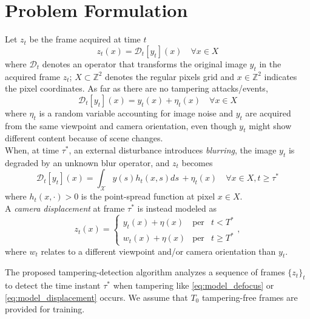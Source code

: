 \documentclass{llncs}
\begin{document}
\section{Problem Formulation}\label{sec:probForm}
%
Let $z_t$ be the frame acquired at time $t$
\begin{equation}
\label{eq:observationModel}
z_t(x)=\mathcal{D}_t[y_t](x) \quad \forall x \in X
\end{equation}
where $\mathcal{D}_t$ denotes an operator that transforms the original image $y_t$ in the acquired frame $z_t$; $X \subset \mathbb{Z}^2$ denotes the regular pixels grid and $x\in \mathbb{Z}^2$ indicates the pixel coordinates. As far as there are no tampering attacks/events,
\begin{equation}
\label{eq:no_tampering}
\mathcal{D}_t[y_t](x) = y_t(x) + \eta_t(x) \quad \forall x \in X
\end{equation}
where $\eta_t$ is a random variable accounting for image noise and $y_t$ are acquired from the same viewpoint and camera orientation, even though $y_t$ might show different content because of scene changes.\\
When, at time $\tau^*$, an external disturbance introduces \emph{blurring}, the image $y_t$ is degraded by an unknown blur operator, and $z_t$ becomes
\begin{equation}
\label{eq:model_defocus}
\mathcal{D}_t[y_t](x) = \int_{\mathcal{X}}y(s)h_t(x,s)ds\, + \eta_t(x) \quad \forall x \in X, t \geq \tau^*
\end{equation}
where $h_t(x,\cdot) > 0$ is the point-spread function at pixel $x \in X$.\\
A \emph{camera displacement} at frame $\tau^*$ is instead modeled as 
\begin{equation}
\label{eq:model_displacement}
z_t(x)  = \left\{ \begin{array}{rcl}
y_t(x) + \eta(x) & \mbox{per} & t < T^* \\
w_t(x) + \eta(x) & \mbox{per} & t \geqslant T^*
\end{array}\right. ,
\end{equation}
where $w_t$ relates to a different viewpoint and/or camera orientation than $y_t$. 

The proposed tampering-detection algorithm analyzes a sequence of frames $\{z_t\}_t$ to detect the time instant $\tau^*$ when tampering like \eqref{eq:model_defocus} or \eqref{eq:model_displacement} occurs. We assume that $T_0$ tampering-free frames are provided for training.
\end{document}
